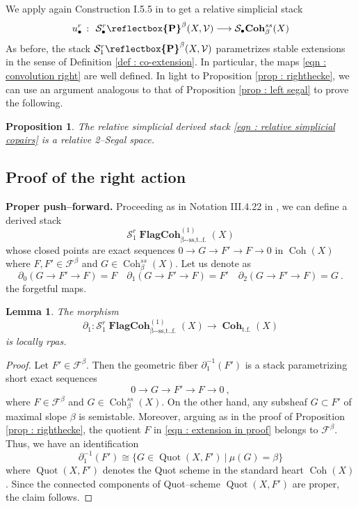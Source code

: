 \documentclass[11pt]{article}
\newtheorem{proposition}[theorem]{Proposition}
\newtheorem{lemma}[theorem]{Lemma}
\newcommand{\segal}{\mathcal{S}}
\newcommand{\fbeta}{\mathcal{F}^{\beta}}
\newcommand{\fbetastack}{\boldsymbol{\operatorname{Coh}}_{\operatorname{t.f.}}(X)}
\newcommand{\coh}{\operatorname{Coh}}
\newcommand{\cohbetass}{\operatorname{Coh}^{ss}_{\beta}(X)}
\newcommand{\cohbetassstack}{\boldsymbol{\operatorname{Coh}}^{ss}_{\beta}(X)}
\newcommand{\copairs}{\boldsymbol{\cop}^{\beta}(X,\mathcal{V})}
\newcommand{\waldhausen}{\mathcal{S}_{\bullet}}
\newcommand{\cop}{\reflectbox{\ensuremath{\operatorname{P}}}}
\begin{document}
\noindent We apply again Construction I.5.5 in \cite{dps} to get a relative simplicial stack
\begin{equation}\label{eqn : relative simplicial copairs}
    u_{\bullet}^r \  \colon \ \waldhausen^r\copairs \longrightarrow \waldhausen\cohbetassstack
\end{equation}
As before, the stack $\segal_1^r\copairs$ parametrizes stable extensions in the sense of Definition \ref{def : co-extension}. In particular, the maps \eqref{eqn : convolution right} are well defined. In light to Proposition \ref{prop : righthecke}, we can use an argument analogous to that of Proposition \ref{prop : left segal} to prove the following.

\begin{proposition}\label{prop : right 2 segal}
    The relative simplicial derived stack \eqref{eqn : relative simplicial copairs} is a relative 2--Segal space.
\end{proposition}



\subsection{Proof of the right action}

\textbf{Proper push--forward. }Proceeding as in Notation III.4.22 in \cite{dps}, we can define a derived stack
\[
    \segal_1^r\boldsymbol{\operatorname{FlagCoh}}^{(1)}_{\operatorname{\beta--ss,t..f.}}(X)
\]
whose closed points are exact sequences $0 \rightarrow G\rightarrow F' \rightarrow F \rightarrow 0$ in $\coh(X)$ where $F, F'\in \fbeta$ and $G\in \cohbetass$. Let us denote as
\[
    \partial_0(G\rightarrow F' \rightarrow F) = F \quad \partial_1(G\rightarrow F' \rightarrow F) = F'\quad \partial_2(G\rightarrow F' \rightarrow F) = G \ .
\]
the forgetful maps.
\begin{lemma}\label{lemma : locally rpas in right action}
    The morphism
    \[
        \partial_1 \colon \segal_1^r\boldsymbol{\operatorname{FlagCoh}}^{(1)}_{\operatorname{\beta--ss,t..f.}}(X) \longrightarrow \fbetastack
    \]
    is locally rpas.
\end{lemma}
\begin{proof}
     Let $F'\in \fbeta$. Then the geometric fiber $\partial_1^{-1}(F')$ is a stack parametrizing short exact sequences 
        \begin{equation}\label{eqn : extension in proof}
       0 \rightarrow G\rightarrow F'\rightarrow F\rightarrow 0 \ , 
        \end{equation}
        where $F\in \fbeta$ and $G\in \cohbetass$. On the other hand, any subsheaf  $G \subset F'$ of maximal slope $\beta$ is semistable. Moreover, arguing as in the proof of Proposition \ref{prop : righthecke}, the quotient $F$ in \eqref{eqn : extension in proof} belongs to $\fbeta$. Thus, we have an identification
        \[
            \partial_1^{-1}(F') \cong \{G \in \operatorname{Quot}(X,F') \ \Big| \  \mu(G) = \beta\}
        \]
        where $\operatorname{Quot}(X,F')$ denotes the Quot scheme in the standard heart $\coh(X)$. Since the connected components of Quot--scheme $\operatorname{Quot}(X,F')$ are proper, the claim follows.
\end{proof}
\end{document}
